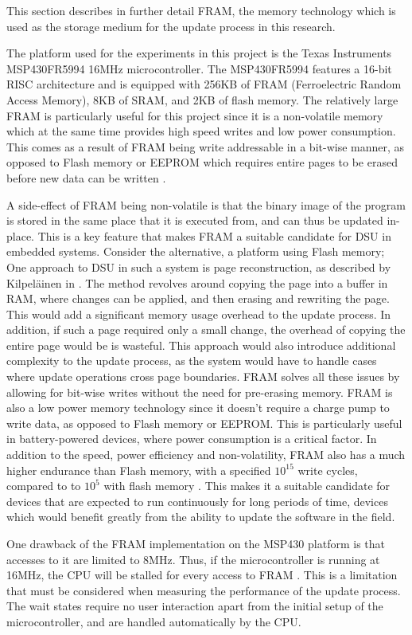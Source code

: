 This section describes in further detail FRAM, the memory technology which is used as the storage medium for the update process in this research. 

The platform used for the experiments in this project is the Texas Instruments MSP430FR5994 16MHz microcontroller. The MSP430FR5994 features a 16-bit RISC architecture and is equipped with 256KB of FRAM (Ferroelectric Random Access Memory), 8KB of SRAM, and 2KB of flash memory. The relatively large FRAM is particularly useful for this project since it is a non-volatile memory which at the same time provides high speed writes and low power consumption. This comes as a result of FRAM being write addressable in a bit-wise manner, as opposed to Flash memory or EEPROM which requires entire pages to be erased before new data can be written \cite{framReport}. 

A side-effect of FRAM being non-volatile is that the binary image of the program is stored in the same place that it is executed from, and can thus be updated in-place. This is a key feature that makes FRAM a suitable candidate for DSU in embedded systems. Consider the alternative, a platform using Flash memory; One approach to DSU in such a system is page reconstruction, as described by Kilpeläinen in \cite{Kilpelainen2023}. The method revolves around copying the page into a buffer in RAM, where changes can be applied, and then erasing and rewriting the page. This would add a significant memory usage overhead to the update process. In addition, if such a page required only a small change, the overhead of copying the entire page would be is wasteful. This approach would also introduce additional complexity to the update process, as the system would have to handle cases where update operations cross page boundaries. FRAM solves all these issues by allowing for bit-wise writes without the need for pre-erasing memory. FRAM is also a low power memory technology since it doesn't require a charge pump to write data, as opposed to Flash memory or EEPROM. This is particularly useful in battery-powered devices, where power consumption is a critical factor. In addition to the speed, power efficiency and non-volatility, FRAM also has a much higher endurance than Flash memory, with a specified $10^{15}$ write cycles, compared to to $10^{5}$ with flash memory \cite{framReport}. This makes it a suitable candidate for devices that are expected to run continuously for long periods of time, devices which would benefit greatly from the ability to update the software in the field.

One drawback of the FRAM implementation on the MSP430 platform is that accesses to it are limited to 8MHz. Thus, if the microcontroller is running at 16MHz, the CPU will be stalled for every access to FRAM \cite{framReport}. This is a limitation that must be considered when measuring the performance of the update process. The wait states require no user interaction apart from the initial setup of the microcontroller, and are handled automatically by the CPU.
